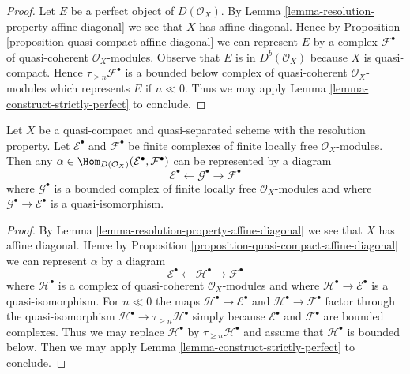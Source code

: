 \begin{proof}
Let $E$ be a perfect object of $D(\mathcal{O}_X)$.
By Lemma \ref{lemma-resolution-property-affine-diagonal}
we see that $X$ has affine diagonal. Hence by
Proposition \ref{proposition-quasi-compact-affine-diagonal}
we can represent $E$ by a complex $\mathcal{F}^\bullet$
of quasi-coherent $\mathcal{O}_X$-modules.
Observe that $E$ is in $D^b(\mathcal{O}_X)$ because
$X$ is quasi-compact. Hence $\tau_{\geq n}\mathcal{F}^\bullet$
is a bounded below complex of quasi-coherent $\mathcal{O}_X$-modules
which represents $E$ if $n \ll 0$. Thus we may apply
Lemma \ref{lemma-construct-strictly-perfect} to conclude.
\end{proof}

\begin{lemma}
\label{lemma-resolution-property-map-perfect-complex}
Let $X$ be a quasi-compact and quasi-separated scheme with the
resolution property. Let $\mathcal{E}^\bullet$ and $\mathcal{F}^\bullet$
be finite complexes of finite locally free $\mathcal{O}_X$-modules.
Then any
$\alpha \in \Hom_{D(\mathcal{O}_X)}(\mathcal{E}^\bullet, \mathcal{F}^\bullet)$
can be represented by a diagram
$$
\mathcal{E}^\bullet \leftarrow \mathcal{G}^\bullet \to \mathcal{F}^\bullet
$$
where $\mathcal{G}^\bullet$ is a bounded complex of finite locally free
$\mathcal{O}_X$-modules and where $\mathcal{G}^\bullet \to \mathcal{E}^\bullet$
is a quasi-isomorphism.
\end{lemma}

\begin{proof}
By Lemma \ref{lemma-resolution-property-affine-diagonal}
we see that $X$ has affine diagonal. Hence by
Proposition \ref{proposition-quasi-compact-affine-diagonal}
we can represent $\alpha$ by a diagram
$$
\mathcal{E}^\bullet \leftarrow \mathcal{H}^\bullet \to \mathcal{F}^\bullet
$$
where $\mathcal{H}^\bullet$ is a complex of quasi-coherent
$\mathcal{O}_X$-modules and where
$\mathcal{H}^\bullet \to \mathcal{E}^\bullet$
is a quasi-isomorphism. For $n \ll 0$ the maps
$\mathcal{H}^\bullet \to \mathcal{E}^\bullet$ and
$\mathcal{H}^\bullet \to \mathcal{F}^\bullet$
factor through the quasi-isomorphism
$\mathcal{H}^\bullet \to \tau_{\geq n}\mathcal{H}^\bullet$
simply because $\mathcal{E}^\bullet$ and $\mathcal{F}^\bullet$
are bounded complexes. Thus we may replace $\mathcal{H}^\bullet$
by $\tau_{\geq n}\mathcal{H}^\bullet$ and assume that $\mathcal{H}^\bullet$
is bounded below.
Then we may apply
Lemma \ref{lemma-construct-strictly-perfect} to conclude.
\end{proof}

